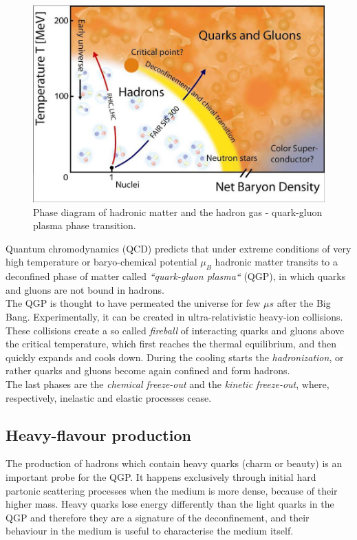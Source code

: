 \documentclass[a4paper,twocolumn,gsifonts,twoside]{gsipaper}
\begin{document}
\begin{figure}[htb]
\begin{center}
\advance\leftskip-1cm
\advance{}
\includegraphics[scale = 0.4]{QCD_phase_diagram.jpg}
\caption{Phase diagram of hadronic matter and the hadron gas - quark-gluon plasma phase transition.}
\label{diagram}
\end{center}
\end{figure}

Quantum chromodynamics (QCD) predicts that under extreme conditions of very high temperature
or baryo-chemical potential $\mu_{B}$ hadronic matter transits to a deconfined phase of matter called \textit{``quark-gluon plasma``}
(QGP), in which quarks and gluons are not bound in hadrons.\\

The QGP is thought to have permeated the universe for few $\mu s$ after the Big Bang. Experimentally, it can be created in 
ultra-relativistic heavy-ion collisions.\\
These collisions create a so called \textit{fireball} of interacting quarks and gluons above the critical temperature, 
which first reaches the thermal equilibrium, and then quickly expands and cools down. During the cooling starts the 
\textit{hadronization}, or rather quarks and gluons become again confined and form hadrons.\\
The last phases are the \textit{chemical freeze-out} and the \textit{kinetic freeze-out}, where, 
respectively, inelastic and elastic processes cease.

\subsection{Heavy-flavour production}
The production of hadrons which contain heavy quarks (charm or beauty) is an important probe for the QGP. It happens exclusively 
through initial hard partonic scattering processes when the medium is more dense, because of their higher mass. Heavy quarks lose 
energy differently than the light quarks in the QGP and therefore they are a signature of the deconfinement, 
and their behaviour in the medium is useful to characterise the medium itself.\\
\end{document}
